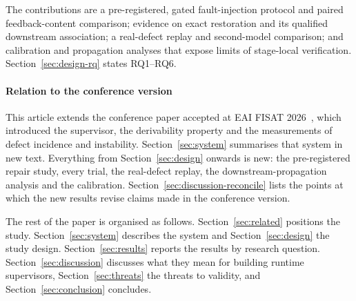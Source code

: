 The contributions are a pre-registered, gated fault-injection protocol and
paired feedback-content comparison; evidence on exact restoration and its
qualified downstream association; a real-defect replay and second-model
comparison; and calibration and propagation analyses that expose limits of
stage-local verification. Section~\ref{sec:design-rq} states RQ1--RQ6.

\paragraph{Relation to the conference version}
\label{sec:intro-extension}
This article extends the conference paper accepted at EAI FISAT
2026~\citep{hoang2026eas}, which introduced the supervisor, the derivability
property and the measurements of defect incidence and instability.
Section~\ref{sec:system} summarises that system in new text. Everything from
Section~\ref{sec:design} onwards is new: the pre-registered repair study, every
trial, the real-defect replay, the downstream-propagation analysis and the
calibration. Section~\ref{sec:discussion-reconcile} lists the points at which
the new results revise claims made in the conference version.

The rest of the paper is organised as follows. Section~\ref{sec:related}
positions the study. Section~\ref{sec:system} describes the system and
Section~\ref{sec:design} the study design. Section~\ref{sec:results} reports
the results by research question. Section~\ref{sec:discussion} discusses what
they mean for building runtime supervisors, Section~\ref{sec:threats} the
threats to validity, and Section~\ref{sec:conclusion} concludes.
